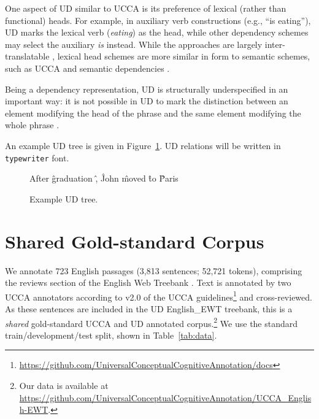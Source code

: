 \documentclass[11pt,a4paper,table]{article}
\begin{document}
  One aspect of UD similar to UCCA is its preference of lexical (rather than functional) heads.
  For example, in auxiliary verb constructions (e.g., ``is eating''), UD
  marks the lexical verb (\textit{eating}) as the head, while other dependency schemes
  may select the auxiliary \textit{is} instead.
  While the approaches are largely inter-translatable
  \citep{Schwartz:12}, lexical head schemes are more similar in form to semantic schemes,
   such as UCCA and semantic dependencies \citep{oepen2016towards}.
   
Being a dependency representation, UD is structurally underspecified in an important way:
​it is not possible in UD to mark the distinction between an element modifying the head of
the phrase and the same element modifying the whole phrase
\cite{doi:10.1146/annurev-linguistics-011718-011842}.
   
An example UD tree is given in Figure~\ref{fig:original_example_ud}.
UD relations will be written in \texttt{typewriter} font.

\begin{figure}[th]
  \centering
    \begin{dependency}[text only label, label style={above,font=\tt}, font=\small]
    \begin{deptext}[column sep=.8em,ampersand replacement=\^]
    After \^ graduation \^ , \^ John \^ moved \^ to \^ Paris \\
    \end{deptext}
    \end{dependency}
\caption{Example UD tree.\label{fig:original_example_ud}}
\end{figure}

\section{Shared Gold-standard Corpus}\label{sec:shared}

We annotate 723 English passages (3,813 sentences; 52,721 tokens),
comprising the reviews section of the 
English Web Treebank \cite[EWT; ][]{bies2012english}.
Text is annotated by two UCCA annotators
according to v2.0 of the UCCA
guidelines\footnote{\url{https://github.com/UniversalConceptualCognitiveAnnotation/docs}}
and cross-reviewed.
As these sentences are included in the UD
English\_EWT treebank, this is a \textit{shared} gold-standard UCCA and UD
annotated corpus.\footnote{Our data is available at \url{https://github.com/UniversalConceptualCognitiveAnnotation/UCCA_English-EWT}.}
We use the standard train/development/test split,
shown in Table~\ref{tab:data}.
\end{document}
